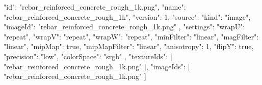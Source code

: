 {
  "id": "rebar_reinforced_concrete_rough_1k.png",
  "name": "rebar_reinforced_concrete_rough_1k",
  "version": 1,
  "source": {
    "kind": "image",
    "imageId": "rebar_reinforced_concrete_rough_1k.png"
  },
  "settings": {
    "wrapU": "repeat",
    "wrapV": "repeat",
    "wrapW": "repeat",
    "minFilter": "linear",
    "magFilter": "linear",
    "mipMap": true,
    "mipMapFilter": "linear",
    "anisotropy": 1,
    "flipY": true,
    "precision": "low",
    "colorSpace": "srgb"
  },
  "textureIds": [
    "rebar_reinforced_concrete_rough_1k.png"
  ],
  "imageIds": [
    "rebar_reinforced_concrete_rough_1k.png"
  ]
}
